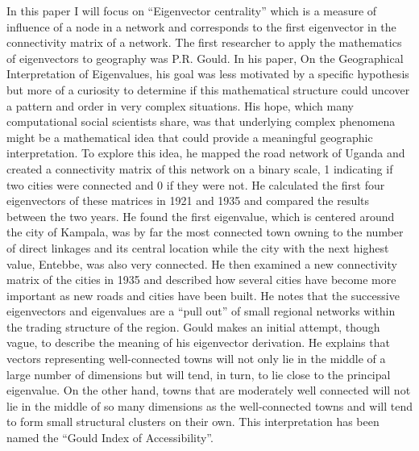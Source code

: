 \documentclass{article}
\theoremstyle{definition}
\theoremstyle{remark}
\begin{document}
In this paper I will focus on ``Eigenvector centrality'' which is a measure of influence of a node in a network and corresponds to the first eigenvector in the connectivity matrix of a network.  The first researcher to apply the mathematics of eigenvectors to geography was P.R. Gould.  In his paper, On the Geographical Interpretation of Eigenvalues, his goal was less motivated by a specific hypothesis but more of a curiosity to determine if this mathematical structure could uncover a pattern and order in very complex situations.\cite{gould1967geographical}  His hope, which many computational social scientists share, was that underlying complex phenomena might be a mathematical idea that could provide a meaningful geographic interpretation.  To explore this idea, he mapped the road network of Uganda and created a connectivity matrix of this network on a binary scale, 1 indicating if two cities were connected and 0 if they were not.  He calculated the first four eigenvectors of these matrices in 1921 and 1935 and compared the results between the two years.  He found the first eigenvalue, which is centered around the city of Kampala, was by far the most connected town owning to the number of direct linkages and its central location while the city with the next highest value, Entebbe, was also very connected.  He then examined a new connectivity matrix of the cities in 1935 and described how several cities have become more important as new roads and cities have been built.  He notes that the successive eigenvectors and eigenvalues are a “pull out” of small regional networks within the trading structure of the region.  Gould makes an initial attempt, though vague, to describe the meaning of his eigenvector derivation.  He explains that vectors representing well-connected towns will not only lie in the middle of a large number of dimensions but will tend, in turn, to lie close to the principal eigenvalue.  On the other hand, towns that are moderately well connected will not lie in the middle of so many dimensions as the well-connected towns and will tend to form small structural clusters on their own.  This interpretation has been named the “Gould Index of Accessibility”.\\
\end{document}

